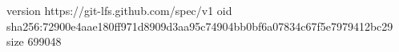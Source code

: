 version https://git-lfs.github.com/spec/v1
oid sha256:72900e4aae180ff971d8909d3aa95c74904bb0bf6a07834c67f5e7979412bc29
size 699048
